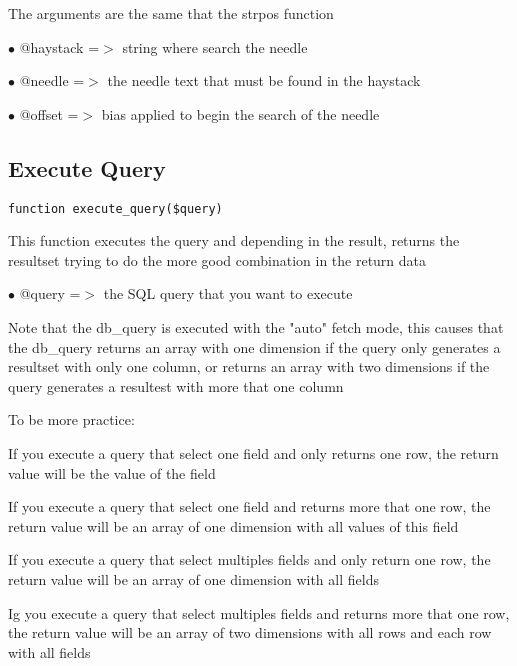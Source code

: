 \documentclass[a4paper]{book}
\begin{document}
The arguments are the same that the strpos function

\begin{compactitem}
\item[\color{myblue}$\bullet$] @haystack =$>$ string where search the needle
\item[\color{myblue}$\bullet$] @needle   =$>$ the needle text that must be found in the haystack
\item[\color{myblue}$\bullet$] @offset   =$>$ bias applied to begin the search of the needle
\end{compactitem}

\hypertarget{toc229}{}
\subsection{Execute Query}

\begin{lstlisting}
function execute_query($query)
\end{lstlisting}

This function executes the query and depending in the result, returns the
resultset trying to do the more good combination in the return data

\begin{compactitem}
\item[\color{myblue}$\bullet$] @query =$>$ the SQL query that you want to execute
\end{compactitem}

Note that the db\_query is executed with the "auto" fetch mode, this causes
that the db\_query returns an array with one dimension if the query only
generates a resultset with only one column, or returns an array with two
dimensions if the query generates a resultest with more that one column

To be more practice:

If you execute a query that select one field and only returns one row,
the return value will be the value of the field

If you execute a query that select one field and returns more that one
row, the return value will be an array of one dimension with all values
of this field

If you execute a query that select multiples fields and only return one
row, the return value will be an array of one dimension with all fields

Ig you execute a query that select multiples fields and returns more that
one row, the return value will be an array of two dimensions with all rows
and each row with all fields
\end{document}
